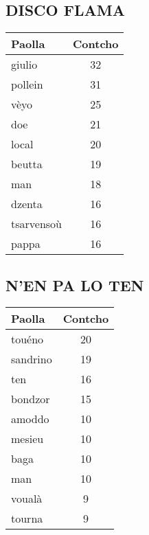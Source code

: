 \vspace{1em}
\begin{minipage}{0.48\textwidth}
\subsection*{DISCO FLAMA}
\begin{tabular}{lc}
\toprule
\textbf{Paolla} & \textbf{Contcho} \\
\midrule
giulio & 32 \\
pollein & 31 \\
vèyo & 25 \\
doe & 21 \\
local & 20 \\
beutta & 19 \\
man & 18 \\
dzenta & 16 \\
tsarvensoù & 16 \\
pappa & 16 \\
\bottomrule
\end{tabular}
\end{minipage}
\hfill
\begin{minipage}{0.48\textwidth}
\subsection*{N'EN PA LO TEN}
\begin{tabular}{lc}
\toprule
\textbf{Paolla} & \textbf{Contcho} \\
\midrule
touéno & 20 \\
sandrino & 19 \\
ten & 16 \\
bondzor & 15 \\
amoddo & 10 \\
mesieu & 10 \\
baga & 10 \\
man & 10 \\
voualà & 9 \\
tourna & 9 \\
\bottomrule
\end{tabular}
\end{minipage}

\vspace{1em}
\newpage

